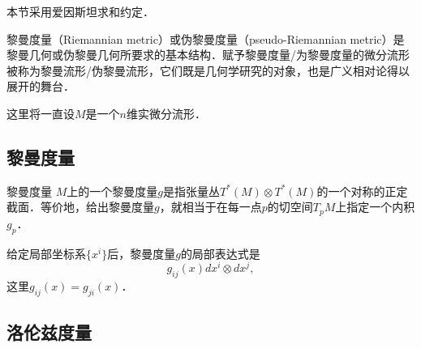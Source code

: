 
本节采用爱因斯坦求和约定．

黎曼度量（Riemannian metric）或伪黎曼度量（pseudo-Riemannian metric）是黎曼几何或伪黎曼几何所要求的基本结构．赋予黎曼度量/为黎曼度量的微分流形被称为黎曼流形/伪黎曼流形，它们既是几何学研究的对象，也是广义相对论得以展开的舞台．

这里将一直设$M$是一个$n$维实微分流形．

\subsection{黎曼度量}
\begin{definition}{黎曼度量}
$M$上的一个黎曼度量$g$是指张量丛$T^*(M)\otimes T^*(M)$的一个对称的正定截面．等价地，给出黎曼度量$g$，就相当于在每一点$p$的切空间$T_pM$上指定一个内积$g_p$．
\end{definition}
给定局部坐标系$\{x^i\}$后，黎曼度量$g$的局部表达式是
$$
g_{ij}(x)dx^i\otimes dx^j,
$$
这里$g_{ij}(x)=g_{ji}(x)$．

\subsection{洛伦兹度量}